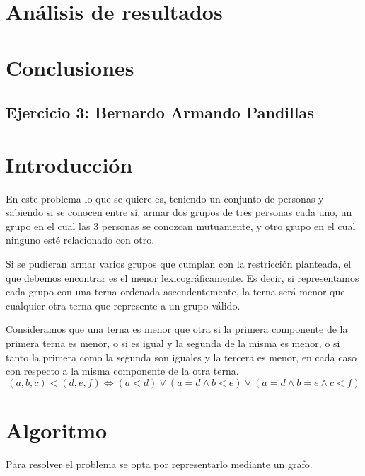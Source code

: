 \documentclass[a4paper, 12pt]{article}
\begin{document}
\section*{An\'alisis de resultados}
\section*{Conclusiones}

\begin{center}
\item \section*{Ejercicio 3: Bernardo Armando Pandillas}
\end{center}

\section*{Introducci\'on}


En este problema lo que se quiere es, teniendo un conjunto de personas y sabiendo si se conocen entre s\'i, armar dos grupos de tres personas cada uno, un grupo en el cual las 3 personas se conozcan mutuamente, y otro grupo en el cual ninguno est\'e relacionado con otro.


Si se pudieran armar varios grupos que cumplan con la restricci\'on planteada, el que debemos encontrar es el menor lexicogr\'aficamente. Es decir, si representamos cada grupo con una terna ordenada ascendentemente, la terna ser\'a menor que cualquier otra terna que represente a un grupo v\'alido.

Consideramos que una terna es menor que otra si la primera componente de la primera terna es menor, o si es igual y la segunda de la misma es menor, o si tanto la primera como la segunda son iguales y la tercera es menor, en cada caso con respecto a la misma componente de la otra terna.
\begin{displaymath}
\left(a, b, c \right) < \left( d, e, f\right) \Leftrightarrow 
\left( a < d \right) \vee \left( a = d \wedge b < e \right) \vee \left( a = d \wedge b = e \wedge c < f \right)
\end{displaymath}


\section*{Algoritmo}


Para resolver el problema se opta por representarlo mediante un grafo.
\end{document}

